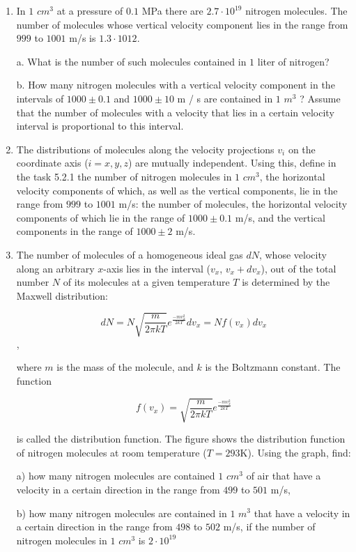 \documentclass{article}
\begin{document}
\begin{enumerate}[label=5.2.\arabic*]

\item In $1$ $cm^3$ at a pressure of $0.1$ MPa there are $2.7 \cdot 10^{19}$ nitrogen molecules. The number of molecules whose vertical velocity component lies in the range from $999$ to $1001$ m/s is $1.3 \cdot 1012$. 

a. What is the number of such molecules contained in $1$ liter of nitrogen? 

b. How many nitrogen molecules with a vertical velocity component in the intervals of $1000 \pm 0.1$ and $1000 \pm 10$ m / s are contained in $1$ $m^3$ ? Assume that the number of molecules with a velocity that lies in a certain velocity interval is proportional to this interval.

\item The distributions of molecules along the velocity projections $v_i$ on the coordinate axis ($i = x, y, z$) are mutually independent. Using this, define in the task 5.2.1 the number of nitrogen molecules in $1$ $cm^3$, the horizontal velocity components of which, as well as the vertical components, lie in the range from $999$ to $1001$ m/s: the number of molecules, the horizontal velocity components of which lie in the range of $1000 \pm 0.1$ m/s, and the vertical components in the range of $1000 \pm 2$ m/s.

\item The number of molecules of a homogeneous ideal gas $dN$, whose velocity along an arbitrary $x$-axis lies in the interval ($v_x$, $v_x + dv_x$), out of the total number $N$ of its molecules at a given temperature $T$ is determined by the Maxwell distribution:

$$dN = N \sqrt{\frac{m}{2 \pi k T}}e^{\frac{-mv_x^2}{2 k T}} dv_x = N f(v_x) dv_x$$,

where $m$ is the mass of the molecule, and $k$ is the Boltzmann constant. The function 

$$f(v_x) = \sqrt{\frac{m}{2 \pi k T}}e^{\frac{-mv_x^2}{2 k T}}$$

is called the distribution function. The figure shows the distribution function of nitrogen molecules at room temperature ($T = 293$K). Using the graph, find: 

a) how many nitrogen molecules are contained $1$ $cm^3$ of air that have a velocity in a certain direction in the range from $499$ to $501$ m/s, 

b) how many nitrogen molecules are contained in $1$ $m^3$ that have a velocity in a certain direction in the range from $498$ to $502$ m/s, if the number of nitrogen molecules in $1$ $cm^3$ is $2 \cdot 10^{19}$


\end{enumerate}
\end{document}

